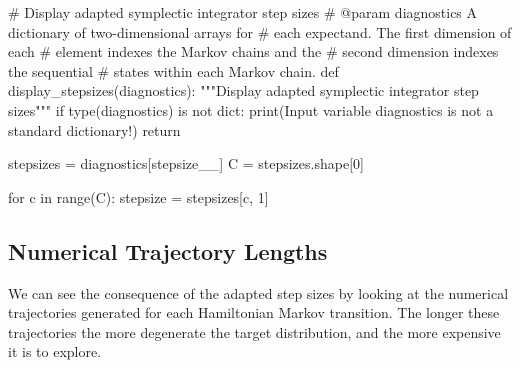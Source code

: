 \documentclass[
  letterpaper,
  DIV=11,
  numbers=noendperiod]{scrartcl}
\newenvironment{Shaded}{\begin{snugshade}}{\end{snugshade}}
\newcommand{\BuiltInTok}[1]{\textcolor[rgb]{0.00,0.23,0.31}{#1}}
\newcommand{\CommentTok}[1]{\textcolor[rgb]{0.37,0.37,0.37}{#1}}
\newcommand{\ControlFlowTok}[1]{\textcolor[rgb]{0.00,0.23,0.31}{#1}}
\newcommand{\DecValTok}[1]{\textcolor[rgb]{0.68,0.00,0.00}{#1}}
\newcommand{\KeywordTok}[1]{\textcolor[rgb]{0.00,0.23,0.31}{#1}}
\newcommand{\NormalTok}[1]{\textcolor[rgb]{0.00,0.23,0.31}{#1}}
\newcommand{\OperatorTok}[1]{\textcolor[rgb]{0.37,0.37,0.37}{#1}}
\newcommand{\StringTok}[1]{\textcolor[rgb]{0.13,0.47,0.30}{#1}}
\begin{document}
\begin{Shaded}
\begin{Highlighting}[]

\CommentTok{\# Display adapted symplectic integrator step sizes}
\CommentTok{\# @param diagnostics A dictionary of two{-}dimensional arrays for }
\CommentTok{\#                    each expectand.  The first dimension of each}
\CommentTok{\#                    element indexes the Markov chains and the }
\CommentTok{\#                    second dimension indexes the sequential }
\CommentTok{\#                    states within each Markov chain.}
\KeywordTok{def}\NormalTok{ display\_stepsizes(diagnostics):}
  \CommentTok{"""Display adapted symplectic integrator step sizes"""}
  \ControlFlowTok{if} \BuiltInTok{type}\NormalTok{(diagnostics) }\KeywordTok{is} \KeywordTok{not} \BuiltInTok{dict}\NormalTok{:}
    \BuiltInTok{print}\NormalTok{(}\StringTok{\textquotesingle{}Input variable \textasciigrave{}diagnostics\textasciigrave{} is not a standard dictionary!\textquotesingle{}}\NormalTok{)}
    \ControlFlowTok{return}
  
\NormalTok{  stepsizes }\OperatorTok{=}\NormalTok{ diagnostics[}\StringTok{\textquotesingle{}stepsize\_\_\textquotesingle{}}\NormalTok{]}
\NormalTok{  C }\OperatorTok{=}\NormalTok{ stepsizes.shape[}\DecValTok{0}\NormalTok{]}
  
  \ControlFlowTok{for}\NormalTok{ c }\KeywordTok{in} \BuiltInTok{range}\NormalTok{(C):}
\NormalTok{    stepsize }\OperatorTok{=}\NormalTok{ stepsizes[c, }\DecValTok{1}\NormalTok{]}
\end{Highlighting}
\end{Shaded}

\hypertarget{numerical-trajectory-lengths}{%
\subsection{Numerical Trajectory
Lengths}\label{numerical-trajectory-lengths}}

We can see the consequence of the adapted step sizes by looking at the
numerical trajectories generated for each Hamiltonian Markov transition.
The longer these trajectories the more degenerate the target
distribution, and the more expensive it is to explore.
\end{document}
